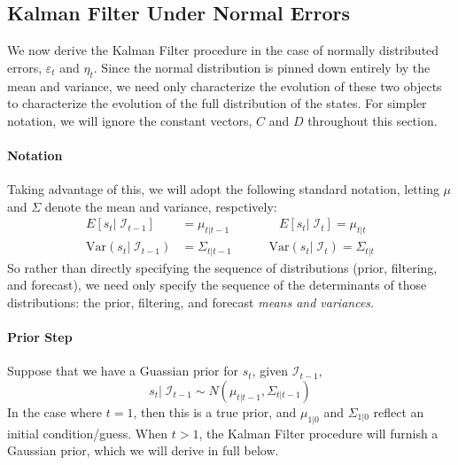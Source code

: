\documentclass[a4paper,12pt]{article}
\begin{document}
\clearpage

\subsection{Kalman Filter Under Normal Errors}
\label{subsec:kfnormal}

We now derive the Kalman Filter procedure in the case of normally
distributed errors, $\varepsilon_t$ and $\eta_t$. Since the normal
distribution is pinned down entirely by the mean and variance, we need
only characterize the evolution of these two objects to characterize the
evolution of the full distribution of the states. For simpler notation,
we will ignore the constant vectors, $C$ and $D$ throughout this
section.

\paragraph{Notation}
Taking advantage of this, we will adopt the following standard notation, letting $\mu$ and $\Sigma$ denote the mean and variance, respctively:
\begin{align*}
  E[s_t|\;\mathcal{I}_{t-1}] &= \mu_{t|t-1}
  \qquad
  \qquad
  E[s_t|\;\mathcal{I}_{t}] = \mu_{t|t}  \\
  \text{Var}(s_t|\;\mathcal{I}_{t-1}) &= \Sigma_{t|t-1}
  \qquad
  \quad
  \text{Var}(s_t|\;\mathcal{I}_{t}) = \Sigma_{t|t}
\end{align*}
So rather than directly specifying the sequence of distributions (prior,
filtering, and forecast), we need only specify the sequence of the
determinants of those distributions: the prior, filtering, and forecast
\emph{means and variances}.

\paragraph{Prior Step}
Suppose that we have a Guassian prior for $s_t$, given $\mathcal{I}_{t-1}$,
\[
  s_t | \; \mathcal{I}_{t-1}
  \sim N(\mu_{t|t-1}, \Sigma_{t|t-1})
\]
In the case where $t=1$, then this is a true prior, and $\mu_{1|0}$ and
$\Sigma_{1|0}$ reflect an initial condition/guess. When $t>1$, the
Kalman Filter procedure will furnish a Gaussian prior, which we will
derive in full below.
\end{document}
